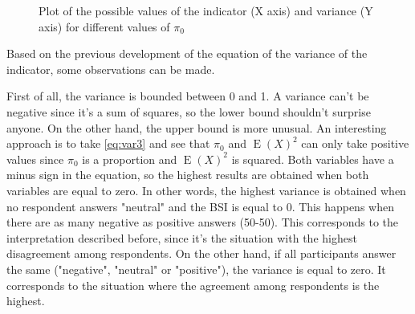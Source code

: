 \documentclass[12pt,a4paper,oneside]{book}
\DeclareMathOperator{\E}{E}
\begin{document}
\begin{figure}[hbt!]
    \caption{Plot of the possible values of the indicator (X axis) and variance (Y axis) for different values of $\pi_0$ }
    \label{fig:var properties}
\end{figure}


Based on the previous development of the equation of the variance of the indicator, some observations can be made.

First of all, the variance is bounded between 0 and 1. 
A variance can't be negative since it's a sum of squares, so the lower bound shouldn't surprise anyone. On the other hand, the upper bound is more unusual. 
An interesting approach is to take \autoref{eq:var3} and see that $\pi_0$ and $\E(X)^2$ can only take positive values since $\pi_0$ is a proportion and $\E(X)^2$ is squared. 
Both variables have a minus sign in the equation, so the highest results are obtained when both variables are equal to zero.
In other words, the highest variance is obtained when no respondent answers "neutral" and the BSI is equal to 0. 
This happens when there are as many negative as positive answers (50-50).
This corresponds to the interpretation described before, since it's the situation with the highest disagreement among respondents.
On the other hand, if all participants answer the same ("negative", "neutral" or "positive"), the variance is equal to zero.
It corresponds to the situation where the agreement among respondents is the highest.
\end{document}
